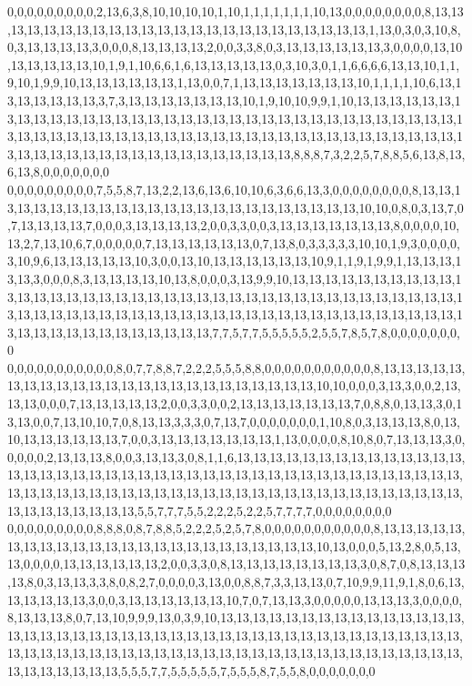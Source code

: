 0,0,0,0,0,0,0,0,0,2,13,6,3,8,10,10,10,10,1,10,1,1,1,1,1,1,1,10,13,0,0,0,0,0,0,0,0,8,13,13,13,13,13,13,13,13,13,13,13,13,13,13,13,13,13,13,13,13,13,13,13,13,1,13,0,3,0,3,10,8,0,3,13,13,13,13,3,0,0,0,8,13,13,13,13,2,0,0,3,3,8,0,3,13,13,13,13,13,13,3,0,0,0,0,13,10,13,13,13,13,13,10,1,9,1,10,6,6,1,6,13,13,13,13,13,0,3,10,3,0,1,1,6,6,6,6,13,13,10,1,1,9,10,1,9,9,10,13,13,13,13,13,13,1,13,0,0,7,1,13,13,13,13,13,13,13,10,1,1,1,1,10,6,13,13,13,13,13,13,13,3,7,3,13,13,13,13,13,13,13,10,1,9,10,10,9,9,1,10,13,13,13,13,13,13,13,13,13,13,13,13,13,13,13,13,13,13,13,13,13,13,13,13,13,13,13,13,13,13,13,13,13,13,13,13,13,13,13,13,13,13,13,13,13,13,13,13,13,13,13,13,13,13,13,13,13,13,13,13,13,13,13,13,13,13,13,13,13,13,13,13,13,13,13,13,13,13,13,13,8,8,8,7,3,2,2,5,7,8,8,5,6,13,8,13,6,13,8,0,0,0,0,0,0,0
0,0,0,0,0,0,0,0,0,7,5,5,8,7,13,2,2,13,6,13,6,10,10,6,3,6,6,13,3,0,0,0,0,0,0,0,0,8,13,13,13,13,13,13,13,13,13,13,13,13,13,13,13,13,13,13,13,13,13,13,13,13,10,10,0,8,0,3,13,7,0,7,13,13,13,13,7,0,0,0,3,13,13,13,13,2,0,0,3,3,0,0,3,13,13,13,13,13,13,13,8,0,0,0,0,10,13,2,7,13,10,6,7,0,0,0,0,0,7,13,13,13,13,13,13,0,7,13,8,0,3,3,3,3,3,10,10,1,9,3,0,0,0,0,3,10,9,6,13,13,13,13,13,10,3,0,0,13,10,13,13,13,13,13,13,10,9,1,1,9,1,9,9,1,13,13,13,13,13,3,0,0,0,8,3,13,13,13,13,10,13,8,0,0,0,3,13,9,9,10,13,13,13,13,13,13,13,13,13,13,13,13,13,13,13,13,13,13,13,13,13,13,13,13,13,13,13,13,13,13,13,13,13,13,13,13,13,13,13,13,13,13,13,13,13,13,13,13,13,13,13,13,13,13,13,13,13,13,13,13,13,13,13,13,13,13,13,13,13,13,13,13,13,13,13,13,13,13,13,7,7,5,7,7,5,5,5,5,5,2,5,5,7,8,5,7,8,0,0,0,0,0,0,0,0
0,0,0,0,0,0,0,0,0,0,0,8,0,7,7,8,8,7,2,2,2,5,5,5,8,8,0,0,0,0,0,0,0,0,0,0,0,8,13,13,13,13,13,13,13,13,13,13,13,13,13,13,13,13,13,13,13,13,13,13,13,13,10,10,0,0,0,3,13,3,0,0,2,13,13,13,0,0,0,7,13,13,13,13,13,2,0,0,3,3,0,0,2,13,13,13,13,13,13,13,7,0,8,8,0,13,13,3,0,13,13,0,0,7,13,10,10,7,0,8,13,13,3,3,3,0,7,13,7,0,0,0,0,0,0,0,1,10,8,0,3,13,13,13,8,0,13,10,13,13,13,13,13,13,7,0,0,3,13,13,13,13,13,13,13,1,13,0,0,0,0,8,10,8,0,7,13,13,13,3,0,0,0,0,0,2,13,13,13,8,0,0,3,13,13,3,0,8,1,1,6,13,13,13,13,13,13,13,13,13,13,13,13,13,13,13,13,13,13,13,13,13,13,13,13,13,13,13,13,13,13,13,13,13,13,13,13,13,13,13,13,13,13,13,13,13,13,13,13,13,13,13,13,13,13,13,13,13,13,13,13,13,13,13,13,13,13,13,13,13,13,13,13,13,13,13,13,13,13,5,5,7,7,7,5,5,2,2,2,5,2,2,5,7,7,7,7,0,0,0,0,0,0,0,0
0,0,0,0,0,0,0,0,0,8,8,8,0,8,7,8,8,5,2,2,2,5,2,5,7,8,0,0,0,0,0,0,0,0,0,0,0,8,13,13,13,13,13,13,13,13,13,13,13,13,13,13,13,13,13,13,13,13,13,13,13,13,10,13,0,0,0,5,13,2,8,0,5,13,13,0,0,0,0,13,13,13,13,13,13,2,0,0,3,3,0,8,13,13,13,13,13,13,13,13,3,0,8,7,0,8,13,13,13,13,8,0,3,13,13,3,3,8,0,8,2,7,0,0,0,0,3,13,0,0,8,8,7,3,3,13,13,0,7,10,9,9,11,9,1,8,0,6,13,13,13,13,13,13,3,0,0,3,13,13,13,13,13,13,10,7,0,7,13,13,3,0,0,0,0,0,13,13,13,3,0,0,0,0,8,13,13,13,8,0,7,13,10,9,9,9,13,0,3,9,10,13,13,13,13,13,13,13,13,13,13,13,13,13,13,13,13,13,13,13,13,13,13,13,13,13,13,13,13,13,13,13,13,13,13,13,13,13,13,13,13,13,13,13,13,13,13,13,13,13,13,13,13,13,13,13,13,13,13,13,13,13,13,13,13,13,13,13,13,13,13,13,13,13,13,13,13,13,13,5,5,5,7,7,5,5,5,5,5,7,5,5,5,8,7,5,5,8,0,0,0,0,0,0,0
